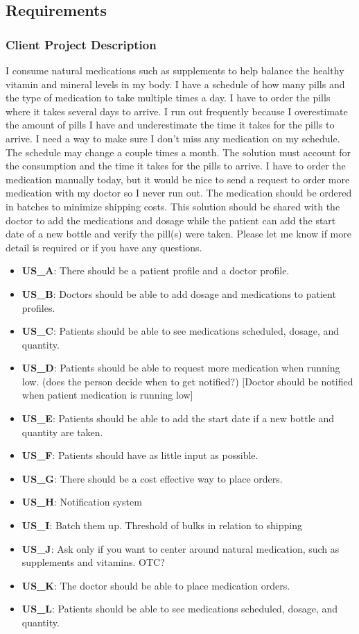 \documentclass{article}
\begin{document}
\subsection{Requirements}
\subsubsection{Client Project Description}
I consume natural medications such as supplements to help balance the healthy vitamin and mineral levels in my body. I have a schedule of how many pills and the type of medication to take multiple times a day. I have to order the pills where it takes several days to arrive. I run out frequently because I overestimate the amount of pills I have and underestimate the time it takes for the pills to arrive. I need a way to make sure I don't miss any medication on my schedule. The schedule may change a couple times a month. The solution must account for the consumption and the time it takes for the pills to arrive. I have to order the medication manually today, but it would be nice to send a request to order more medication with my doctor so I never run out. The medication should be ordered in batches to minimize shipping costs. This solution should be shared with the doctor to add the medications and dosage while the patient can add the start date of a new bottle and verify the pill(s) were taken. Please let me know if more detail is required or if you have any questions. 
\begin{itemize}
    \item \textbf{US\_A}: There should be a patient profile and a doctor profile.
    \item \textbf{US\_B}: Doctors should be able to add dosage and medications to patient profiles.
    \item \textbf{US\_C}: Patients should be able to see medications scheduled, dosage, and quantity. 
    \item \textbf{US\_D}: Patients should be able to request more medication when running low. (does the person decide when to get notified?) [Doctor should be notified when patient medication is running low]
    \item \textbf{US\_E}: Patients should be able to add the start date if a new bottle and quantity are taken.
    \item \textbf{US\_F}: Patients should have as little input as possible. 
    \item \textbf{US\_G}: There should be a cost effective way to place orders.
    \item  \textbf{US\_H}: Notification system
    \item \textbf{US\_I}: Batch them up. Threshold of bulks in relation to shipping 
    \item \textbf{US\_J}: Ask only if you want to center around natural medication, such as supplements and vitamins. OTC?
    \item \textbf{US\_K}: The doctor should be able to place medication orders.
    \item \textbf{US\_L}: Patients should be able to see medications scheduled, dosage, and quantity. 

\end{itemize}
\end{document}
